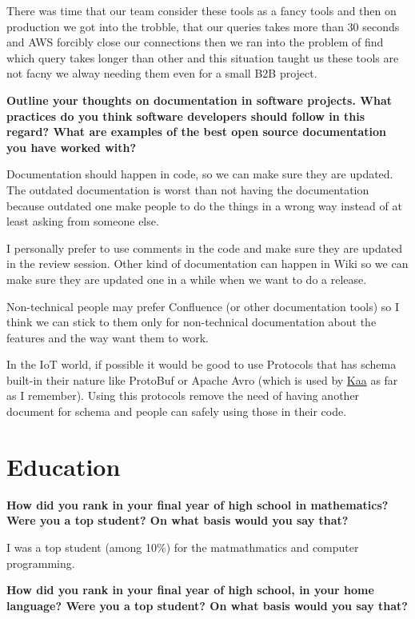 There was time that our team consider these tools as a fancy tools and then on production we got into the trobble,
that our queries takes more than 30 seconds and AWS forcibly close our connections then we ran into the problem of
find which query takes longer than other and this situation taught us these tools are not facny we alway needing them
even for a small B2B project.

\noindent
\textbf{Outline your thoughts on documentation in software projects. What practices do you think software developers
should follow in this regard? What are examples of the best open source documentation you have worked with?}

Documentation should happen in code, so we can make sure they are updated. The outdated documentation is worst than
not having the documentation because outdated one make people to do the things in a wrong way instead of at least
asking from someone else.

I personally prefer to use comments in the code and make sure they are updated in the review session. Other kind of
documentation can happen in Wiki so we can make sure they are updated one in a while when we want to do a release.

Non-technical people may prefer Confluence (or other documentation tools) so I think we can stick to them only for
non-technical documentation about the features and the way want them to work.

In the IoT world, if possible it would be good to use Protocols that has schema built-in their nature like ProtoBuf or
Apache Avro (which is used by \href{https://github.com/kaaproject/kaa}{Kaa} as far as I remember). Using this protocols
remove the need of having another document for schema and people can safely using those in their code.

\section{Education}

\noindent
\textbf{How did you rank in your final year of high school in mathematics? Were you a top student? On what basis would you say that?}

I was a top student (among 10\%) for the matmathmatics and computer programming.

\noindent
\textbf{How did you rank in your final year of high school, in your home language? Were you a top student? On what basis would you say that?}

